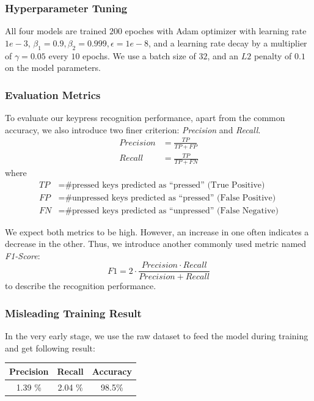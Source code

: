 \documentclass[10pt,twocolumn,letterpaper]{article}
\begin{document}
\subsubsection{Hyperparameter Tuning}

All four models are trained \(200\) epoches with Adam optimizer with learning rate \(1e-3\), \(\beta_1 = 0.9, \beta_2 = 0.999, \epsilon = 1e-8\), and a learning rate decay by a multiplier of \(\gamma=0.05\) every $10$ epochs. 
We use a batch size of \(32\), and an \(L2\) penalty of \(0.1\) on the model parameters. 


\subsubsection{Evaluation Metrics}

To evaluate our keypress recognition performance, apart from the common accuracy, we also introduce two finer criterion: \textit{Precision} and \textit{Recall}.
\begin{align*}
   Precision &= \frac{TP}{TP+FP}\\
   Recall &= \frac{TP}{TP+FN}
\end{align*}
where
\begin{align*}
   TP &= \text{\# pressed keys predicted as ``pressed'' (True Positive)}\\
   FP &= \text{\# unpressed keys predicted as ``pressed'' (False Positive)}\\
   FN &= \text{\# pressed keys predicted as ``unpressed'' (False Negative)}
\end{align*}

We expect both metrics to be high. However, an increase in one often indicates a decrease in the other.
Thus, we introduce another commonly used metric named \textit{F1-Score}:
$$F1 = 2\cdot\dfrac{Precision\cdot Recall}{Precision + Recall}$$
to describe the recognition performance.

\subsubsection{Misleading Training Result}

In the very early stage, we use the raw dataset to feed the model during training and get following result:\\

\begin{minipage}{0.9\linewidth}
   \centering
\begin{tabular}{ccc}
   \toprule
   Precision &Recall&Accuracy\\
   \midrule
   1.39 \%& 2.04 \%&98.5\%\\
   \bottomrule
   \end{tabular}
    \label{tab:prevdataset}

\end{minipage}
\end{document}
